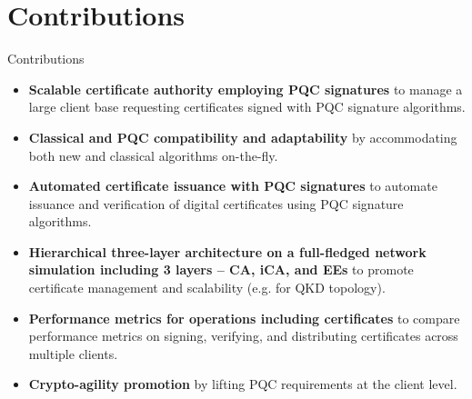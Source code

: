 \documentclass[10pt]{beamer}
\begin{document}
\section{Contributions}
\begin{frame}{Contributions}
	\begin{itemize}
		\item \textbf{Scalable certificate authority employing PQC signatures} to manage a large client base requesting certificates signed with PQC signature algorithms.
		\item \textbf{Classical and PQC compatibility and adaptability} by accommodating both new and classical algorithms on-the-fly.
		\item \textbf{Automated certificate issuance with PQC signatures} to automate issuance and verification of digital certificates using PQC signature algorithms.
		\item \textbf{Hierarchical three-layer architecture on a full-fledged network simulation including 3 layers -- CA, iCA, and EEs} to promote certificate management and scalability (e.g. for QKD topology).
		\item \textbf{Performance metrics for operations including certificates} to compare performance metrics on signing, verifying, and distributing certificates across multiple clients.
		\item  \textbf{Crypto-agility promotion} by lifting PQC requirements at the client level.
	\end{itemize}
\end{frame}
\end{document}

